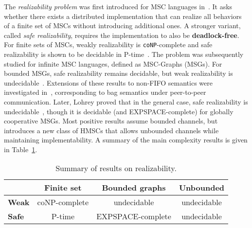 The \emph{realizability problem} was first introduced for MSC languages 
in~\cite{alur2000inference,alur2003inference}. It asks whether there exists a distributed 
implementation that can realize all behaviors of a finite set of MSCs 
without introducing additional ones. A stronger variant, called 
\emph{safe realizability}, requires the implementation to also be \textbf{deadlock-free}. 
For finite sets of MSCs, weakly realizability is \verb|coNP|-complete and safe 
realizability is shown to be decidable in P-time~\cite{alur2005realizability}.
The problem was subsequently studied for infinite MSC languages, defined 
as MSC-Graphs (MSGs). For bounded MSGs, safe realizability 
remains decidable, but weak realizability 
is undecidable~\cite{alur2005realizability}. Extensions of these results to non-FIFO 
semantics were investigated in~\cite{morin2002recognizable}, corresponding 
to bag semantics under peer-to-peer communication. 
Later, Lohrey proved that in the general case, safe realizability 
is undecidable~\cite{lohrey2003realizability}, though it is decidable (and 
EXPSPACE-complete) for globally cooperative MSGs.
Most positive results assume bounded channels, but \cite{bollig2025high} introduces 
a new class of HMSCs that allows unbounded channels while maintaining implementability.
A summary of the main complexity results is given in Table~\ref{tab:realizability}.

\begin{table}[!ht]
	\centering
	\begin{tabular}{|l|c|c|c|}
		\hline
		& \textbf{Finite set} & \textbf{Bounded graphs} & \textbf{Unbounded} \\
		\hline
		\textbf{Weak} & coNP-complete & undecidable & undecidable \\
		\hline
		\textbf{Safe} & P-time & EXPSPACE-complete & undecidable \\
		\hline
	\end{tabular}
	\caption{Summary of results on realizability.}
	\label{tab:realizability}
\end{table}



